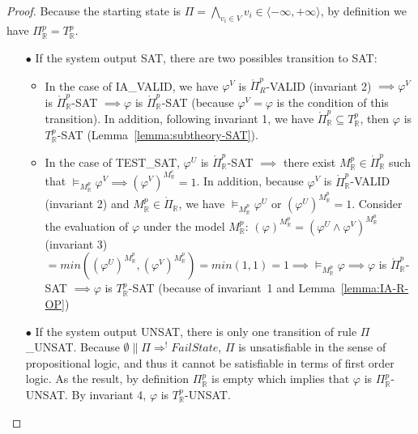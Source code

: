 \begin{proof} Because the starting state is $\Pi = \bigwedge\limits_{v_i \in V} v_i \in \langle -\infty, +\infty \rangle$, by definition we have $\Pi^p_\mathbb{R} = T^p_\mathbb{R}$.
\begin{itemize}
\item[$\bullet$] If the system output SAT, there are two possibles transition to SAT:
\begin{itemize}
\item In the case of IA\_VALID, we have $\varphi^V$ is $\mathring{\Pi}_{R}^p$-VALID (invariant 2) $\implies \varphi^V$ is $\mathring{\Pi}^p_\mathbb{R}$-SAT $\implies \varphi$ is $\mathring{\Pi}^p_\mathbb{R}$-SAT (because $\varphi^V = \varphi$ is the condition of this transition). In addition, following invariant 1, we have $\mathring{\Pi}^p_\mathbb{R} \subseteq T^p_\mathbb{R}$, then $\varphi$ is $T^p_\mathbb{R}$-SAT (Lemma~\ref{lemma:subtheory-SAT}).
\item \sloppy In the case of TEST\_SAT, $\varphi^U$ is $\mathring{\Pi}^p_\mathbb{R}$-SAT $\implies$ there exist $M^p_\mathbb{R} \in \mathring{\Pi}^p_\mathbb{R}$ such that $\models_{M^p_\mathbb{R}} \varphi^V \implies (\varphi^V)^{M^c_\mathbb{R}} = 1$. In addition, because $\varphi^V$ is $\mathring{\Pi}^p_\mathbb{R}$-VALID (invariant 2) and $M^p_\mathbb{R} \in \mathring{\Pi}_\mathbb{R}$, we have $\models_{M^p_\mathbb{R}} \varphi^U$ or ${(\varphi^U)^{M^p_\mathbb{R}} = 1}$. Consider the evaluation of $\varphi$ under the model $M^p_\mathbb{R}$: ${(\varphi)^{M^p_\mathbb{R}} = (\varphi^U \wedge \varphi^V)^{M^p_\mathbb{R}}}$ (invariant 3) $= min((\varphi^U)^{M^p_\mathbb{R}}, (\varphi^V)^{M^p_\mathbb{R}}) = min(1, 1) = 1 \implies \models_{M^p_\mathbb{R}} \varphi \implies \varphi$ is $\mathring{\Pi}^p_\mathbb{R}$-SAT $\implies \varphi$ is $T^p_\mathbb{R}$-SAT (because of invariant~1 and Lemma~\ref{lemma:IA-R-OP})
\end{itemize}
\item[$\bullet$]  If the system output UNSAT, there is only one transition of rule $\Pi$\_UNSAT. Because $\emptyset \parallel \Pi \Longrightarrow^! FailState$, $\Pi$ is unsatisfiable in the sense of propositional logic, and thus it cannot be satisfiable in terms of first order logic. As the result, by definition $\Pi^p_\mathbb{R}$ is empty which implies that $\varphi$ is $\Pi^p_\mathbb{R}$-UNSAT. By invariant 4, $\varphi$ is $T^p_\mathbb{R}$-UNSAT.
\end{itemize}
\end{proof}

